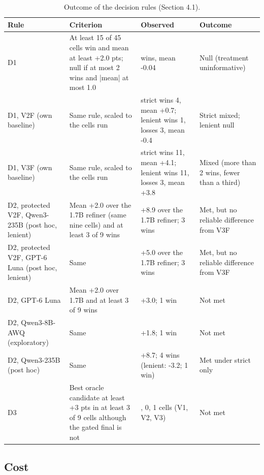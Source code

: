 \documentclass{ieeeaccess}
\begin{document}
\begin{table}[htbp]
\centering
\small
\caption{Outcome of the decision rules (Section 4.1).}
\begin{tabular}{>{\raggedright\arraybackslash}p{}>{\raggedright\arraybackslash}p{}>{\raggedright\arraybackslash}p{}>{\raggedright\arraybackslash}p{}}
\toprule
\textbf{Rule} & \textbf{Criterion} & \textbf{Observed} & \textbf{Outcome} \\
\midrule
D1 & At least 15 of 45 cells win and mean at least +2.0 pts; null if at most 2 wins and |mean| at most 1.0 & 0 wins, mean -0.04 & Null (treatment uninformative) \\
D1, V2F (own baseline) & Same rule, scaled to the cells run & strict wins 4, mean +0.7; lenient wins 1, losses 3, mean -0.4 & Strict mixed; lenient null \\
D1, V3F (own baseline) & Same rule, scaled to the cells run & strict wins 11, mean +4.1; lenient wins 11, losses 3, mean +3.8 & Mixed (more than 2 wins, fewer than a third) \\
D2, protected V2F, Qwen3-235B (post hoc, lenient) & Mean +2.0 over the 1.7B refiner (same nine cells) and at least 3 of 9 wins & +8.9 over the 1.7B refiner; 3 wins & Met, but no reliable difference from V3F \\
D2, protected V2F, GPT-6 Luna (post hoc, lenient) & Same & +5.0 over the 1.7B refiner; 3 wins & Met, but no reliable difference from V3F \\
D2, GPT-6 Luna & Mean +2.0 over 1.7B and at least 3 of 9 wins & +3.0; 1 win & Not met \\
D2, Qwen3-8B-AWQ (exploratory) & Same & +1.8; 1 win & Not met \\
D2, Qwen3-235B (post hoc) & Same & +8.7; 4 wins (lenient: -3.2; 1 win) & Met under strict only \\
D3 & Best oracle candidate at least +3 pts in at least 3 of 9 cells although the gated final is not & 0, 0, 1 cells (V1, V2, V3) & Not met \\
\bottomrule
\end{tabular}
\end{table}

\subsection{Cost}
\end{document}
